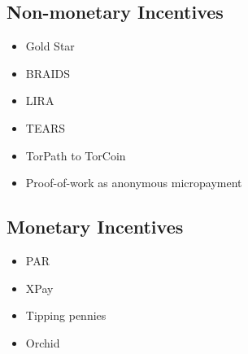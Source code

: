 \subsection{Non-monetary Incentives}

\begin{itemize}
\item Gold Star
\item BRAIDS
\item LIRA
\item TEARS
\item TorPath to TorCoin
\item Proof-of-work as anonymous micropayment
\end{itemize}

\subsection{Monetary Incentives}
\begin{itemize}
\item PAR
\item XPay
\item Tipping pennies
\item Orchid
\end{itemize}